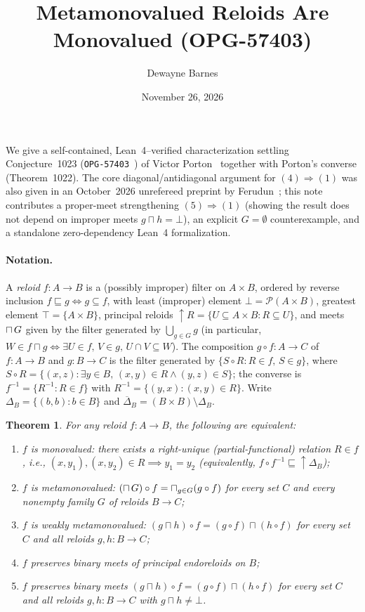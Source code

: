 \documentclass[11pt]{article}
\title{Metamonovalued Reloids Are Monovalued (OPG-57403)}
\author{Dewayne Barnes}
\date{November 26, 2026}
\newtheorem{theorem}{Theorem}
\theoremstyle{remark}
\newcommand{\bigsqcap}{\mathop{\mathchoice{\vcenter{\hbox{\Large$\sqcap$}}}{\sqcap}{\sqcap}{\sqcap}}}
\begin{document}
\maketitle

We give a self-contained, Lean~4--verified characterization settling Conjecture~1023 (\texttt{OPG-57403}~\cite{opg57403}) of Victor Porton~\cite{porton} together with Porton's converse (Theorem~1022).
The core diagonal/antidiagonal argument for $(4) \Rightarrow (1)$ was also given in an October~2026 unrefereed preprint by Ferudun~\cite{ferudun}; this note contributes a proper-meet strengthening $(5) \Rightarrow (1)$ (showing the result does not depend on improper meets $g \sqcap h = \bot$), an explicit $G = \emptyset$ counterexample, and a standalone zero-dependency Lean~4 formalization.

\paragraph{Notation.}
A \emph{reloid} $f : A \to B$ is a (possibly improper) filter on $A \times B$, ordered by reverse inclusion $f \sqsubseteq g \iff g \subseteq f$, with least (improper) element $\bot = \mathcal{P}(A \times B)$, greatest element $\top = \{A \times B\}$, principal reloids $\uparrow R = \{U \subseteq A \times B : R \subseteq U\}$, and meets $\bigsqcap G$ given by the filter generated by $\bigcup_{g \in G} g$ (in particular, $W \in f \sqcap g \iff \exists U \in f,\, V \in g,\, U \cap V \subseteq W$).
The composition $g \circ f : A \to C$ of $f : A \to B$ and $g : B \to C$ is the filter generated by $\{S \circ R : R \in f,\, S \in g\}$, where $S \circ R = \{(x,z) : \exists y \in B,\, (x,y) \in R \wedge (y,z) \in S\}$; the converse is $f^{-1} = \{R^{-1} : R \in f\}$ with $R^{-1} = \{(y,x) : (x,y) \in R\}$.
Write $\Delta_B = \{(b,b) : b \in B\}$ and $\overline{\Delta}_B = (B \times B) \setminus \Delta_B$.

\begin{theorem}
For any reloid $f : A \to B$, the following are equivalent:
\begin{enumerate}[label=(\arabic*)]
  \item $f$ is \emph{monovalued}: there exists a right-unique (partial-functional) relation $R \in f$, i.e., $(x,y_1), (x,y_2) \in R \implies y_1 = y_2$ (equivalently, $f \circ f^{-1} \sqsubseteq \uparrow\Delta_B$);
  \item $f$ is \emph{metamonovalued}: $(\bigsqcap G) \circ f = \bigsqcap_{g \in G} (g \circ f)$ for every set $C$ and every nonempty family $G$ of reloids $B \to C$;
  \item $f$ is \emph{weakly metamonovalued}: $(g \sqcap h) \circ f = (g \circ f) \sqcap (h \circ f)$ for every set $C$ and all reloids $g, h : B \to C$;
  \item $f$ preserves binary meets of principal endoreloids on $B$;
  \item $f$ preserves binary meets $(g \sqcap h) \circ f = (g \circ f) \sqcap (h \circ f)$ for every set $C$ and all reloids $g, h : B \to C$ with $g \sqcap h \neq \bot$.
\end{enumerate}
\end{theorem}
\end{document}
